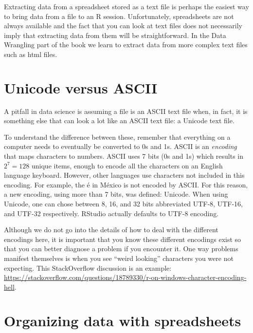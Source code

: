 \documentclass[
]{krantz}
\begin{document}
Extracting data from a spreadsheet stored as a text file is perhaps the easiest way to bring data from a file to an R session. Unfortunately, spreadsheets are not always available and the fact that you can look at text files does not necessarily imply that extracting data from them will be straightforward. In the Data Wrangling part of the book we learn to extract data from more complex text files such as html files.

\hypertarget{unicode-versus-ascii}{%
\section{Unicode versus ASCII}\label{unicode-versus-ascii}}

A pitfall in data science is assuming a file is an ASCII text file when, in fact, it is something else that can look a lot like an ASCII text file: a Unicode text file.

To understand the difference between these, remember that everything on a computer needs to eventually be converted to 0s and 1s. ASCII is an \emph{encoding} that maps characters to numbers. ASCII uses 7 bits (0s and 1s) which results in \(2^7 = 128\) unique items, enough to encode all the characters on an English language keyboard. However, other languages use characters not included in this encoding. For example, the é in México is not encoded by ASCII. For this reason, a new encoding, using more than 7 bits, was defined: Unicode. When using Unicode, one can chose between 8, 16, and 32 bits abbreviated UTF-8, UTF-16, and UTF-32 respectively. RStudio actually defaults to UTF-8 encoding.

Although we do not go into the details of how to deal with the different encodings here, it is important that you know these different encodings exist so that you can better diagnose a problem if you encounter it. One way problems manifest themselves is when you see ``weird looking'' characters you were not expecting. This StackOverflow discussion is an example: \url{https://stackoverflow.com/questions/18789330/r-on-windows-character-encoding-hell}.

\hypertarget{organizing-data-with-spreadsheets}{%
\section{Organizing data with spreadsheets}\label{organizing-data-with-spreadsheets}}
\end{document}
